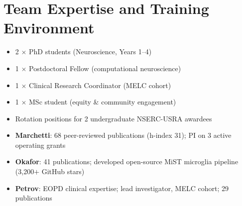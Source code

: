 \section{Team Expertise and Training Environment}

\begin{minipage}[t]{0.48\linewidth}
  \begin{tcolorbox}[
    enhanced,
    colback=cihrLightGray,
    colframe=cihrMidGray,
    sharp corners, boxrule=0.6pt,
    left=6pt, right=6pt, top=6pt, bottom=6pt,
    parbox=false,
    title={\faGraduationCap\enspace Trainee Positions},
    fonttitle=\bfseries\fontsize{8}{10}\selectfont\color{cihrNavy},
    coltitle=cihrNavy,
    attach boxed title to top left={yshift=-2mm, xshift=4mm},
    boxed title style={colback=cihrLightGray, sharp corners}
  ]
    \begin{itemize}[leftmargin=12pt, itemsep=2pt, topsep=2pt, parsep=0pt]
      \item 2 $\times$ PhD students (Neuroscience, Years 1--4)
      \item 1 $\times$ Postdoctoral Fellow (computational neuroscience)
      \item 1 $\times$ Clinical Research Coordinator (MELC cohort)
      \item 1 $\times$ MSc student (equity \& community engagement)
      \item Rotation positions for 2 undergraduate NSERC-USRA awardees
    \end{itemize}
  \end{tcolorbox}
\end{minipage}%
\hfill
\begin{minipage}[t]{0.48\linewidth}
  \begin{tcolorbox}[
    enhanced,
    colback=cihrLightGray,
    colframe=cihrMidGray,
    sharp corners, boxrule=0.6pt,
    left=6pt, right=6pt, top=6pt, bottom=6pt,
    parbox=false,
    title={\faChartLine\enspace Productivity Indicators},
    fonttitle=\bfseries\fontsize{8}{10}\selectfont\color{cihrNavy},
    coltitle=cihrNavy,
    attach boxed title to top left={yshift=-2mm, xshift=4mm},
    boxed title style={colback=cihrLightGray, sharp corners}
  ]
    \begin{itemize}[leftmargin=12pt, itemsep=2pt, topsep=2pt, parsep=0pt]
      \item \textbf{Marchetti}: 68 peer-reviewed publications (h-index 31); PI on 3 active operating grants
      \item \textbf{Okafor}: 41 publications; developed open-source MiST microglia pipeline (3,200$+$ GitHub stars)
      \item \textbf{Petrov}: EOPD clinical expertise; lead investigator, MELC cohort; 29 publications
    \end{itemize}
  \end{tcolorbox}
\end{minipage}

\par\vspace{6pt}

